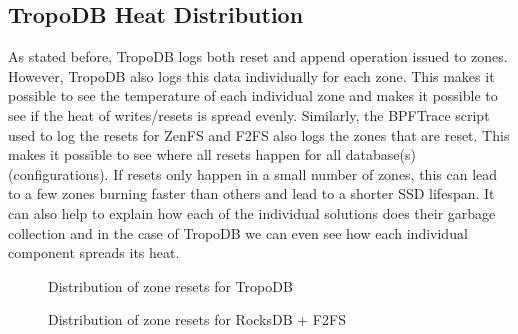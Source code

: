 \subsection{TropoDB Heat Distribution}
\label{sec:heatdist}
As stated before, TropoDB logs both reset and append operation issued to zones. However, TropoDB also logs this data individually for each zone. This makes it possible to see the temperature of each individual zone and makes it possible to see if the heat of writes/resets is spread evenly. Similarly, the BPFTrace script used to log the resets for ZenFS and F2FS also logs the zones that are reset. This makes it possible to see where all resets happen for all database(s) (configurations). If resets only happen in a small number of zones, this can lead to a few zones burning faster than others and lead to a shorter SSD lifespan. It can also help to explain how each of the individual solutions does their garbage collection and in the case of TropoDB we can even see how each individual component spreads its heat.

\begin{figure}[!ht]
    \hspace*{-0.075\textwidth} %
    \raggedleft
    \caption{ Distribution of zone resets for TropoDB }
    \label{fig:resetdistrtropodb}
\end{figure}

\begin{figure}[!ht]
    \hspace*{-0.075\textwidth} %
    \raggedleft
    \caption{ Distribution of zone resets for RocksDB + F2FS }
    \label{fig:resetdistrrocksf2fs}
\end{figure}


